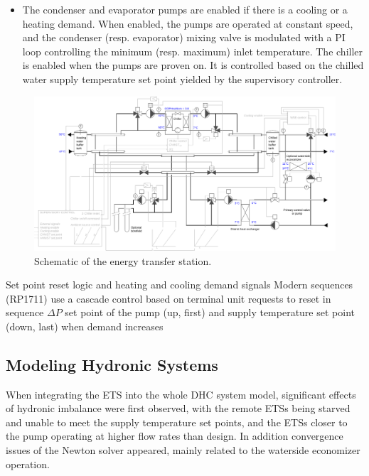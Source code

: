\begin{itemize}
    \item The condenser and evaporator pumps are enabled if there is a cooling or a heating demand. When enabled, the pumps are operated at constant speed, and the condenser (resp. evaporator) mixing valve is modulated with a PI loop controlling the minimum (resp. maximum) inlet temperature. The chiller is enabled when the pumps are proven on. It is controlled based on the chilled water supply temperature set point yielded by the supervisory controller.
\end{itemize}

\begin{figure}[!htbp]
\centering
\includegraphics[width=\linewidth]{figures/ChillerBorefield.pdf}
\caption{Schematic of the energy transfer station.}
\label{fig:schematic}
\end{figure}

Set point reset logic and heating and cooling demand signals
Modern sequences (RP1711) use a cascade control based on terminal unit requests to reset in sequence \(\Delta P\) set point of the pump (up, first) and supply temperature set point (down, last) when demand increases





\subsection{Modeling Hydronic Systems} \label{sec:balancing}

When integrating the ETS into the whole DHC system model, significant effects of hydronic imbalance were first observed, with the remote ETSs being starved and unable to meet the supply temperature set points, and the ETSs closer to the pump operating at higher flow rates than design.
In addition convergence issues of the Newton solver appeared, mainly related to the waterside economizer operation.


